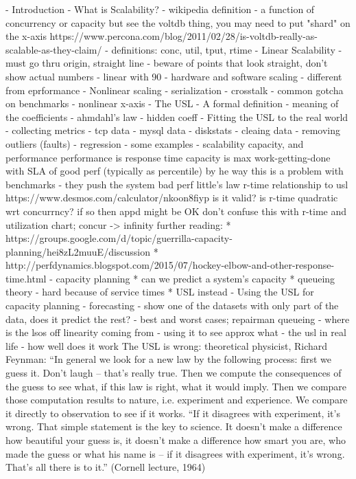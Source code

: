 \documentclass{vivid_layout_pdf}
\begin{document}
- Introduction
- What is Scalability?
	- wikipedia definition
   - a function of concurrency or capacity
	  but see the voltdb thing, you may need to put "shard" on the x-axis
	  https://www.percona.com/blog/2011/02/28/is-voltdb-really-as-scalable-as-they-claim/
	- definitions: conc, util, tput, rtime
	- Linear Scalability
	- must go thru origin, straight line
	- beware of points that look straight, don't show actual numbers
	- linear with 90%
	- hardware and software scaling
	- different from eprformance
- Nonlinear scaling
  - serialization
  - crosstalk
  - common gotcha on benchmarks - nonlinear x-axis
- The USL
	- A formal definition
	- meaning of the coefficients
	- ahmdahl's law
	- hidden coeff
- Fitting the USL to the real world
	- collecting metrics
		- tcp data
		- mysql data
		- diskstats
	- cleaing data - removing outliers (faults)
	- regression
	- some examples
- scalability capacity, and performance
  performance is response time
  capacity  is max work-getting-done with SLA of good perf (typically as percentile)
	 by he way this is a problem with benchmarks - they push the system bad perf
	little's law
	r-time relationship to usl
	https://www.desmos.com/calculator/nkoon8fiyp
	is it valid? is r-time quadratic wrt concurrncy? if so then appd might be OK
	don't confuse this with r-time and utilization chart; concur -> infinity
	further reading:
 * https://groups.google.com/d/topic/guerrilla-capacity-planning/hei8zL2muuE/discussion
  * http://perfdynamics.blogspot.com/2015/07/hockey-elbow-and-other-response-time.html
- capacity planning
      * can we predict a system’s capacity
		    * queueing theory - hard because of service times
			     * USL instead
- Using the USL for capacity planning
  - forecasting
  - show one of the datasets with only part of the data, does it predict the
  rest?
  - best and worst cases; repairman queueing
  - where is the lsos off linearity coming from
  - using it to see approx what %
- the usl in real life
  - how well does it work
	The USL is wrong:
	theoretical physicist, Richard Feynman:
	“In general we look for a new law by the following process: first we guess it.
	Don’t laugh -- that’s really true. Then we compute the consequences of the guess
	to see what, if this law is right, what it would imply. Then we compare those
	computation results to nature, i.e. experiment and experience. We compare it
	directly to observation to see if it works.
	“If it disagrees with experiment, it’s wrong. That simple statement is the key
	to science. It doesn’t make a difference how beautiful your guess is, it doesn’t
	make a difference how smart you are, who made the guess or what his name is --
	if it disagrees with experiment, it’s wrong. That’s all there is to it.”
	(Cornell lecture, 1964)
\end{document}
